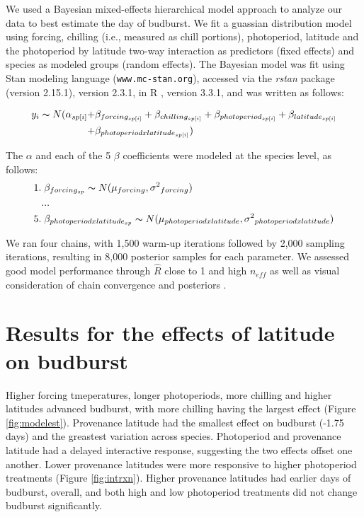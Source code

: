 \documentclass{article}\usepackage[]{graphicx}\usepackage[]{color}
\begin{document}
We used a Bayesian mixed-effects hierarchical model approach to analyze our data to best estimate the day of budburst. We fit a guassian distribution model using forcing, chilling (i.e., measured as chill portions), photoperiod, latitude and the photoperiod by latitude two-way interaction as predictors (fixed effects) and species as modeled groups (random effects). The Bayesian model was fit using Stan modeling language \citep{Carpenter2017}(\texttt{www.mc-stan.org}), accessed via the \textit{rstan} package (version 2.15.1), version 2.3.1, in R \citep{R}, version 3.3.1, and was written as follows: 

\begin{align*}
y_i \thicksim N(\alpha_{sp[i]} +& \beta_{forcing_{sp[i]}} + \beta_{chilling_{sp[i]}} + \beta_{photoperiod_{sp[i]}} + \beta_{latitude_{sp[i]}}  \\
	+& \beta_{photoperiod x latitude_{sp[i]}}  )
\end{align*}

\noindent The $\alpha$ and each of the 5 $\beta$ coefficients were modeled at the species level, as follows:
\begin{align*}
1.& \; \beta_{forcing_{sp}} \thicksim N(\mu_{forcing}, \sigma{^2}_{forcing}) \\
   &... \\
5.& \; \beta_{photoperiod x latitude_{sp}} \thicksim N(\mu_{photoperiod x latitude}, \sigma{^2}_{photoperiod x latitude})
\end{align*}

We ran four chains, with 1,500 warm-up iterations followed by 2,000 sampling iterations, resulting in 8,000 posterior samples for each parameter. We assessed good model performance through $\hat{R}$ close to 1 and high $n_{eff}$ as well as visual consideration of chain convergence and posteriors \citep{Gelman2006}. 

\section*{Results for the effects of latitude on budburst}
Higher forcing tmeperatures, longer photoperiods, more chilling and higher latitudes advanced budburst, with more chilling having the largest effect (Figure \ref{fig:modelest}). Provenance latitude had the smallest effect on budburst (-1.75 days) and the greastest variation across species. Photoperiod and provenance latitude had a delayed interactive response, suggesting the two effects offset one another. Lower provenance latitudes were more responsive to higher photoperiod treatments (Figure \ref{fig:intrxn}). Higher provenance latitudes had earlier days of budburst, overall, and both high and low photoperiod treatments did not change budburst significantly. 
\end{document}
